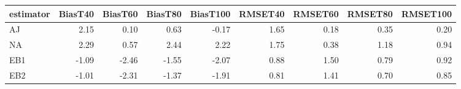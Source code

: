 \begin{table}[ht]
\centering
\begin{tabular}{lrrrrrrrr}
  \toprule
estimator & BiasT40 & BiasT60 & BiasT80 & BiasT100 & RMSET40 & RMSET60 & RMSET80 & RMSET100 \\ 
  \midrule
AJ & 2.15 & 0.10 & 0.63 & -0.17 & 1.65 & 0.18 & 0.35 & 0.20 \\ 
  NA & 2.29 & 0.57 & 2.44 & 2.22 & 1.75 & 0.38 & 1.18 & 0.94 \\ 
  EB1 & -1.09 & -2.46 & -1.55 & -2.07 & 0.88 & 1.50 & 0.79 & 0.92 \\ 
  EB2 & -1.01 & -2.31 & -1.37 & -1.91 & 0.81 & 1.41 & 0.70 & 0.85 \\ 
   \bottomrule
\end{tabular}
\end{table}
